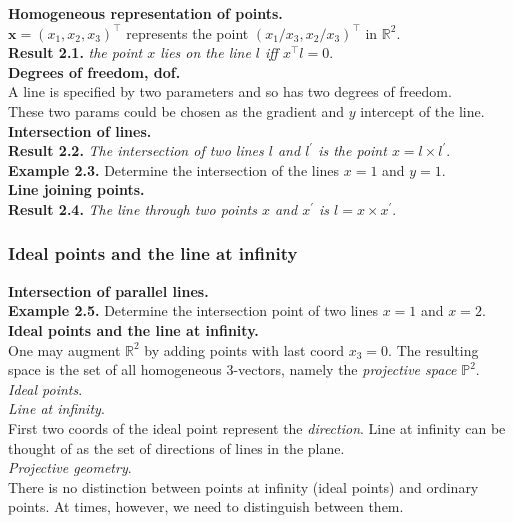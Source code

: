 \documentclass[12pt]{article}
\begin{document}
\noindent \textbf{Homogeneous representation of points.} \\
$\textbf{x} = {(x_1, x_2, x_3)}^\top$ represents the point ${(x_1 / x_3, x_2 / x_3)}^\top$ in $\mathbb{R}^2$. \\
\textbf{Result 2.1.} \textit{the point $x$ lies on the line $l$ iff $x^\top l = 0$}. \\

\noindent \textbf{Degrees of freedom, dof.} \\
A line is specified by two parameters and so has two degrees of freedom. \\
These two params could be chosen as the gradient and $y$ intercept of the line. \\

\noindent \textbf{Intersection of lines.} \\
\textbf{Result 2.2.} \textit{The intersection of two lines $l$ and $l^\prime$ is the point $x = l \times l^\prime$}.
\textbf{Example 2.3.} Determine the intersection of the lines $x = 1$ and $y = 1$. \\

\noindent \textbf{Line joining points.} \\
\textbf{Result 2.4.} \textit{The line through two points $x$ and $x^\prime$ is $l = x \times x^\prime$}.

\subsubsection{Ideal points and the line at infinity}
\textbf{Intersection of parallel lines.} \\
\textbf{Example 2.5.} Determine the intersection point of two lines $x = 1$ and $x = 2$. \\

\noindent \textbf{Ideal points and the line at infinity.} \\
One may augment $\mathbb{R}^2$ by adding points with last coord $x_3 = 0$. 
The resulting space is the set of all homogeneous 3-vectors, namely the \textit{projective space} $\mathbb{P}^2$. \\
\textit{Ideal points}. \\
\textit{Line at infinity}. \\
First two coords of the ideal point represent the \textit{direction}. Line at infinity can be thought of as the set of directions of lines in the plane. \\
\textit{Projective geometry}. \\
There is no distinction between points at infinity (ideal points) and ordinary points. 
At times, however, we need to distinguish between them. \\
\end{document}
